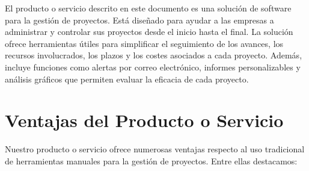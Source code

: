 
                El producto o servicio descrito en este documento es una solución de software para la gestión de proyectos. Está diseñado para ayudar a las empresas a administrar y controlar sus proyectos desde el inicio hasta el final. La solución ofrece herramientas útiles para simplificar el seguimiento de los avances, los recursos involucrados, los plazos y los costes asociados a cada proyecto. Además, incluye funciones como alertas por correo electrónico, informes personalizables y análisis gráficos que permiten evaluar la eficacia de cada proyecto. 
            
                \section{Ventajas del Producto o Servicio} \label{sec:ventajas_producto_servicio} 
            
                Nuestro producto o servicio ofrece numerosas ventajas respecto al uso tradicional de herramientas manuales para la gestión de proyectos. Entre ellas destacamos: 

